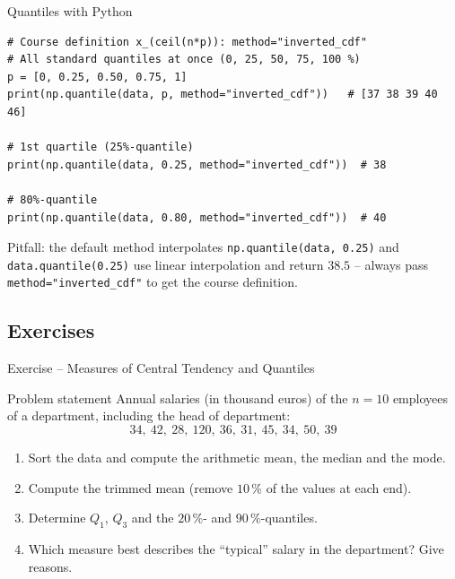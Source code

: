 \documentclass[aspectratio=169,11pt]{beamer}
\begin{document}
\begin{frame}[fragile]{Quantiles with Python}
\begin{lstlisting}
# Course definition x_(ceil(n*p)): method="inverted_cdf"
# All standard quantiles at once (0, 25, 50, 75, 100 %)
p = [0, 0.25, 0.50, 0.75, 1]
print(np.quantile(data, p, method="inverted_cdf"))   # [37 38 39 40 46]

# 1st quartile (25%-quantile)
print(np.quantile(data, 0.25, method="inverted_cdf"))  # 38

# 80%-quantile
print(np.quantile(data, 0.80, method="inverted_cdf"))  # 40
\end{lstlisting}
\begin{alertblock}{Pitfall: the default method interpolates}
  \texttt{np.quantile(data, 0.25)} and \texttt{data.quantile(0.25)} use
  linear interpolation and return $38.5$ -- always pass
  \texttt{method="inverted\_cdf"} to get the course definition.
\end{alertblock}
\end{frame}

\subsection{Exercises}

\begin{frame}{Exercise -- Measures of Central Tendency and Quantiles}
  \begin{block}{Problem statement}
    Annual salaries (in thousand euros) of the $n = 10$ employees of a department,
    including the head of department:
    \[ 34,\ 42,\ 28,\ 120,\ 36,\ 31,\ 45,\ 34,\ 50,\ 39 \]
    \begin{enumerate}
      \item[a)] Sort the data and compute the arithmetic mean, the median and the mode.
      \item[b)] Compute the trimmed mean (remove $10\,\%$ of the values at each end).
      \item[c)] Determine $Q_1$, $Q_3$ and the $20\,\%$- and $90\,\%$-quantiles.
      \item[d)] Which measure best describes the ``typical'' salary in the department? Give reasons.
    \end{enumerate}
  \end{block}
\end{frame}
\end{document}
